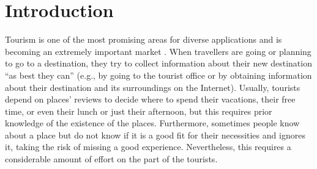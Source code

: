 \section{Introduction}


Tourism is one of the most promising areas for diverse applications and is becoming an extremely
important market \cite{buhalis2011tourism,murphy2013tourism,fermoso2015open,ku2015cultivating,alghamdi2016tourism,artemenko2017tourism,kazandzhieva2019tourism}. 
When travellers are going or planning to go to a destination, they try to collect information about their new destination “as best they can” (e.g., by going to the tourist office or by obtaining information about their destination and its surroundings on the Internet). Usually, tourists depend on places' reviews to decide where to spend their vacations, their free time, or even their lunch or just their afternoon, but this requires prior knowledge of the existence of the places. Furthermore, sometimes people know about a place but do not know if it is a good fit for their necessities and ignores it, taking the risk of missing a good experience. Nevertheless, this requires a considerable amount of effort on the part of the tourists.

